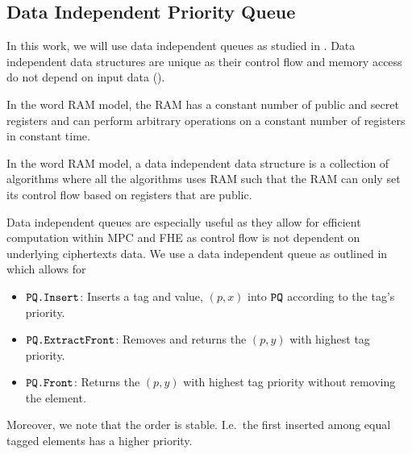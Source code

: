 \subsection{Data Independent Priority Queue}
In this work, we will use data independent queues as studied in \cite{toft2011secure, mitchell2014data, mazloom2023efficient}.
Data independent data structures are unique as their control flow and memory access do not depend on input data (\cite{mitchell2014data}).

\begin{definition}
	In the word RAM model, the RAM has a constant number of public and secret registers and can perform arbitrary operations on a constant number of registers in constant time.
\end{definition}

\begin{definition}
	In the word RAM model, a data independent data structure is a collection of algorithms where
	all the algorithms uses RAM such that the RAM can only set its	control flow based on registers that are public.
\end{definition}

Data independent queues are especially useful as they allow for efficient computation within MPC and FHE as control flow is not dependent
on underlying ciphertexts data. We use a data independent queue as outlined in \cite{mazloom2023efficient}
which allows for
\begin{itemize}
	\item $\texttt{PQ.Insert}$: Inserts a tag and value, $(p, x)$ into $\texttt{PQ}$ according to the tag's priority.
	\item $\texttt{PQ.ExtractFront}$: Removes and returns the $(p, y)$ with highest tag priority.
	\item $\texttt{PQ.Front}$: Returns the $(p, y)$ with highest tag priority without removing the element.
\end{itemize}
Moreover, we note that the order is stable. I.e.\ the first inserted among equal tagged elements has a higher priority.


